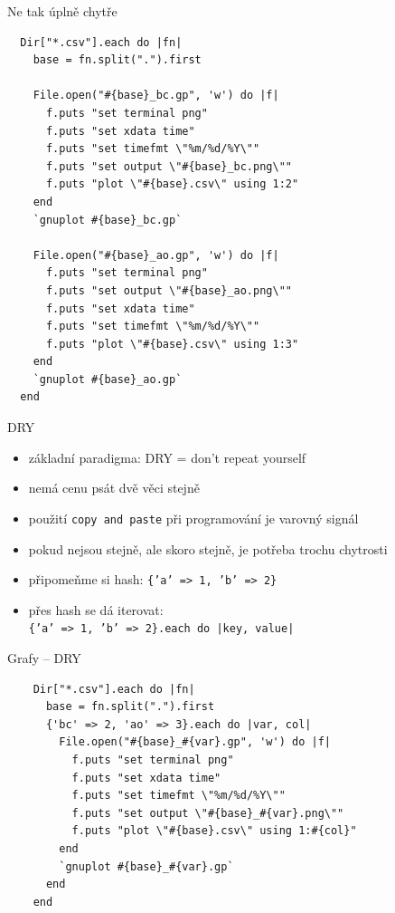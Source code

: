 \documentclass{beamer}
\begin{document}
\begin{frame}[fragile]{Ne tak úplně chytře}
  \tiny
\begin{verbatim}
  Dir["*.csv"].each do |fn|
    base = fn.split(".").first

    File.open("#{base}_bc.gp", 'w') do |f|
      f.puts "set terminal png"
      f.puts "set xdata time"
      f.puts "set timefmt \"%m/%d/%Y\""
      f.puts "set output \"#{base}_bc.png\""
      f.puts "plot \"#{base}.csv\" using 1:2"
    end
    `gnuplot #{base}_bc.gp`

    File.open("#{base}_ao.gp", 'w') do |f|
      f.puts "set terminal png"
      f.puts "set output \"#{base}_ao.png\""
      f.puts "set xdata time"
      f.puts "set timefmt \"%m/%d/%Y\""
      f.puts "plot \"#{base}.csv\" using 1:3"
    end
    `gnuplot #{base}_ao.gp`
  end
\end{verbatim}
\end{frame}

\begin{frame}[fragile]{DRY}
  \begin{itemize}
    \item základní paradigma: DRY = don't repeat yourself
    \item nemá cenu psát dvě věci stejně
    \item použití \texttt{copy and paste} při programování je varovný signál
    \item pokud nejsou stejně, ale skoro stejně, je potřeba trochu chytrosti
    \item připomeňme si hash: \texttt{\{'a' => 1, 'b' => 2\}}
    \item přes hash se dá iterovat: \\ \texttt{\{'a' => 1, 'b' => 2\}.each do |key, value|}
  \end{itemize}
\end{frame}

\begin{frame}[fragile]{Grafy -- DRY}
  \tiny
  \begin{verbatim}
    Dir["*.csv"].each do |fn|
      base = fn.split(".").first
      {'bc' => 2, 'ao' => 3}.each do |var, col|
        File.open("#{base}_#{var}.gp", 'w') do |f|
          f.puts "set terminal png"
          f.puts "set xdata time"
          f.puts "set timefmt \"%m/%d/%Y\""
          f.puts "set output \"#{base}_#{var}.png\""
          f.puts "plot \"#{base}.csv\" using 1:#{col}"
        end
        `gnuplot #{base}_#{var}.gp`
      end
    end
  \end{verbatim}
\end{frame}
\end{document}
